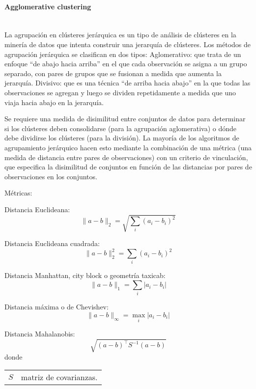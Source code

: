 \documentclass[12pt]{article}
\makeatletter
\newcommand{\subsubsubsection}[1]{\paragraph{#1}\mbox{}\\}
\newenvironment{conditions}
{\par\vspace{\abovedisplayskip}\noindent\begin{tabular}{>{$}l<{$} @{${}={}$} l}}
	{\end{tabular}\par\vspace{\belowdisplayskip}}
\makeatother
\begin{document}
				\subsubsubsection{Agglomerative clustering}
				La agrupación en clústeres jerárquica es un tipo de análisis de clústeres en la minería de datos que intenta construir una jerarquía de clústeres. Los métodos de agrupación jerárquica se clasifican en dos tipos:
				Aglomerativo: que trata de un enfoque ``de abajo hacia arriba'' en el que cada observación se asigna a un grupo separado, con pares de grupos que se fusionan a medida que aumenta la jerarquía.
				Divisivo: que es una técnica ``de arriba hacia abajo'' en la que todas las observaciones se agregan y luego se dividen repetidamente a medida que uno viaja hacia abajo en la jerarquía. \cite{Sharma2013} 
				
				
				Se requiere una medida de disimilitud entre conjuntos de datos para determinar si los clústeres deben consolidarse (para la agrupación aglomerativa) o dónde debe dividirse los clústeres (para la división). La mayoría de los algoritmos de agrupamiento jerárquico hacen esto mediante la combinación de una métrica (una medida de distancia entre pares de observaciones) con un criterio de vinculación, que especifica la disimilitud de conjuntos en función de las distancias por pares de observaciones en los conjuntos. \cite{Sasirekha2013}
				
				
				Métricas:
				
				Distancia Euclideana:
				\begin{equation}\label{eq:euclidean_distance}
				\parallel a-b \parallel_2 = \sqrt{\sum_i (a_i-b_i)^{2}}
				\end{equation}
				
				Distancia Euclideana cuadrada:
				\begin{equation}\label{eq:squared_euclidean_distance}
				\parallel a-b \parallel_{2}^{2} = \sum_i (a_i-b_i)^{2}
				\end{equation}
				
				Distancia Manhattan, city block o geometría taxicab:
				\begin{equation}\label{eq:taxicab}
				\parallel a-b \parallel_1 = \sum_i |a_i-b_i|
				\end{equation}
				
				Distancia máxima o de Chevishev:
				\begin{equation}\label{eq:Chevishev}
				\parallel a-b \parallel_{\infty} = \max_{i} |a_i-b_i|
				\end{equation}
				
				Distancia Mahalanobis:
				\begin{equation}\label{eq:Mahalanobis}
				\sqrt{(a-b)^{\top} S^{-1}(a-b)} 
				\end{equation}
				donde
				\begin{conditions}
					S & matriz de covarianzas. 
				\end{conditions}
				
\end{document}
